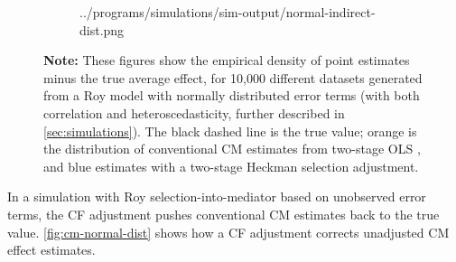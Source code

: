 \begin{figure}[h!]
\begin{subfigure}[c]{0.475\textwidth}
{            ../programs/simulations/sim-output/normal-indirect-dist.png}
    \end{subfigure}
    \label{fig:cm-normal-dist}
    \justify
    \footnotesize    
    \textbf{Note:}
    These figures show the empirical density of point estimates minus the true average effect, for 10,000 different datasets generated from a Roy model with normally distributed error terms (with both correlation and heteroscedasticity, further described in \autoref{sec:simulations}).
    The black dashed line is the true value;
    orange is the distribution of conventional CM estimates from two-stage OLS \citep{imai2010identification},
    and blue estimates with a two-stage Heckman selection adjustment.
\end{figure}

In a simulation with Roy selection-into-mediator based on unobserved error terms, the CF adjustment pushes conventional CM estimates back to the true value. 
\autoref{fig:cm-normal-dist} shows how a CF adjustment corrects unadjusted CM effect estimates.
